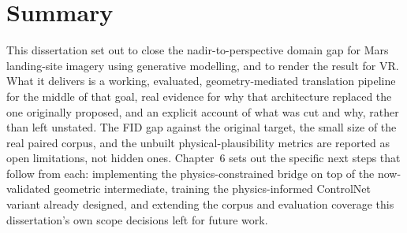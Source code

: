 \section{Summary}
\label{sec:conclusions-summary}

This dissertation set out to close the nadir-to-perspective domain gap for Mars landing-site imagery using generative modelling, and to render the result for VR. What it delivers is a working, evaluated, geometry-mediated translation pipeline for the middle of that goal, real evidence for why that architecture replaced the one originally proposed, and an explicit account of what was cut and why, rather than left unstated. The FID gap against the original target, the small size of the real paired corpus, and the unbuilt physical-plausibility metrics are reported as open limitations, not hidden ones. Chapter~6 sets out the specific next steps that follow from each: implementing the physics-constrained bridge on top of the now-validated geometric intermediate, training the physics-informed ControlNet variant already designed, and extending the corpus and evaluation coverage this dissertation's own scope decisions left for future work.
